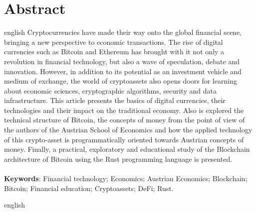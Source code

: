 \documentclass[article,12pt,oneside,a4paper,english,brazil]{unifil}
\begin{document}
\section*{Abstract}
\begin{otherlanguage*}{english}
Cryptocurrencies have made their way onto the global financial scene, bringing a new perspective to economic transactions. The rise of digital currencies such as Bitcoin and Ethereum has brought with it not only a revolution in financial technology, but also a wave of speculation, debate and innovation. However, in addition to its potential as an investment vehicle and medium of exchange, the world of cryptoassets also opens doors for learning about economic sciences, cryptographic algorithms, security and data infrastructure. This article presents the basics of digital currencies, their technologies and their impact on the traditional economy. Also is explored the technical structure of Bitcoin, the concepts of money from the point of view of the authors of the Austrian School of Economics and how the applied technology of this crypto-asset is programmatically oriented towards Austrian concepts of money. Finally, a practical, exploratory and educational study of the Blockchain architecture of Bitcoin using the Rust programming language is presented.\\
\vspace{\onelineskip}\\
\noindent
\textbf{Keywords}: Financial technology; Economics; Austrian Economics; Blockchain; Bitcoin; Financial education; Cryptoassets; DeFi; Rust.
\end{otherlanguage*}{english}
\end{document}
